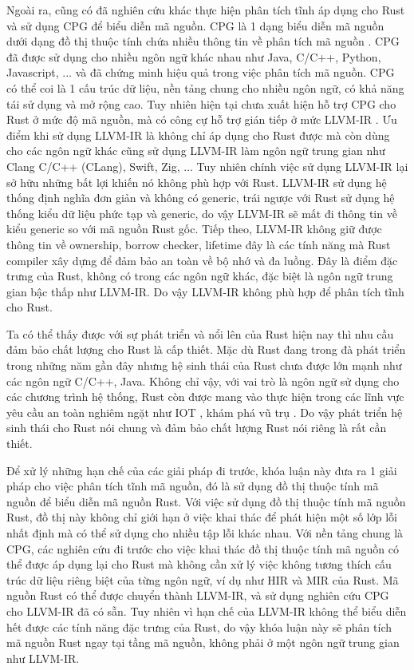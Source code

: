 Ngoài ra, cũng có đã nghiên cứu khác thực hiện phân tích tĩnh áp dụng cho Rust và sử dụng CPG để biểu diễn mã nguồn.
CPG là 1 dạng biểu diễn mã nguồn dưới dạng đồ thị thuộc tính chứa nhiều thông tin về phân tích mã nguồn \cite{yamaguchi2014modeling}.
CPG đã được sử dụng cho nhiều ngôn ngữ khác nhau như Java, C/C++, Python, Javascript, ... và đã chứng minh hiệu quả trong việc phân tích mã nguồn.
CPG có thể coi là 1 cấu trúc dữ liệu, nền tảng chung cho nhiều ngôn ngữ, có khả năng tái sử dụng và mở rộng cao.
Tuy nhiên hiện tại chưa xuất hiện hỗ trợ CPG cho Rust ở mức độ mã nguồn, mà có công cự hỗ trợ gián tiếp ở mức LLVM-IR \cite{kuchler2022representing}.
Ưu điểm khi sử dụng LLVM-IR \cite{lattner2004llvm} là không chỉ áp dụng cho Rust được mà còn dùng cho các ngôn ngữ khác cũng sử dụng LLVM-IR làm ngôn ngữ trung gian như Clang C/C++ (CLang), Swift, Zig, ...
Tuy nhiên chính việc sử dụng LLVM-IR lại sở hữu những bất lợi khiến nó không phù hợp với Rust.
LLVM-IR sử dụng hệ thống định nghĩa đơn giản và không có generic, trái ngược với Rust sử dụng hệ thống kiểu dữ liệu phức tạp và generic, do vậy LLVM-IR sẽ mất đi thông tin về kiểu generic so với mã nguồn Rust gốc.
Tiếp theo, LLVM-IR không giữ được thông tin về ownership, borrow checker, lifetime đây là các tính năng mà Rust compiler xây dựng để đảm bảo an toàn về bộ nhớ và đa luồng.
Đây là điểm đặc trưng của Rust, không có trong các ngôn ngữ khác, đặc biệt là ngôn ngữ trung gian bậc thấp như LLVM-IR.
Do vậy LLVM-IR không phù hợp để phân tích tĩnh cho Rust.

Ta có thể thấy được với sự phát triển và nổi lên của Rust hiện nay thì nhu cầu đảm bảo chất lượng cho Rust là cấp thiết.
Mặc dù Rust đang trong đà phát triển trong những năm gần đây nhưng hệ sinh thái của Rust chưa được lớn mạnh như các ngôn ngữ C/C++, Java.
Không chỉ vậy, với vai trò là ngôn ngữ sử dụng cho các chương trình hệ thống, Rust còn được mang vào thực hiện trong các lĩnh vực yêu cầu an toàn nghiêm ngặt như IOT \cite{sharma2023rust}, khám phá vũ trụ \cite{seidel2024bringing}.
Do vậy phát triển hệ sinh thái cho Rust nói chung và đảm bảo chất lượng Rust nói riêng là rất cần thiết.

Để xử lý những hạn chế của các giải pháp đi trước, khóa luận này đưa ra 1 giải pháp cho việc phân tích tĩnh mã nguồn, đó là sử dụng đồ thị thuộc tính mã nguồn để biểu diễn mã nguồn Rust.
Với việc sử dụng đồ thị thuộc tính mã nguồn Rust, đồ thị này không chỉ giới hạn ở việc khai thác để phát hiện một số lớp lỗi nhất định mà có thể sử dụng cho nhiều tập lỗi khác nhau.
Với nền tảng chung là CPG, các nghiên cứu đi trước cho việc khai thác đồ thị thuộc tính mã nguồn có thể được áp dụng lại cho Rust mà không cần xử lý việc không tương thích cấu trúc dữ liệu riêng biệt của từng ngôn ngữ, ví dụ như HIR và MIR của Rust.
Mã nguồn Rust có thể được chuyển thành LLVM-IR, và sử dụng nghiên cứu CPG cho LLVM-IR đã có sẵn.
Tuy nhiên vì hạn chế của LLVM-IR không thể biểu diễn hết được các tính năng đặc trưng của Rust, do vậy khóa luận này sẽ phân tích mã nguồn Rust ngay tại tầng mã nguồn, không phải ở một ngôn ngữ trung gian như LLVM-IR.

